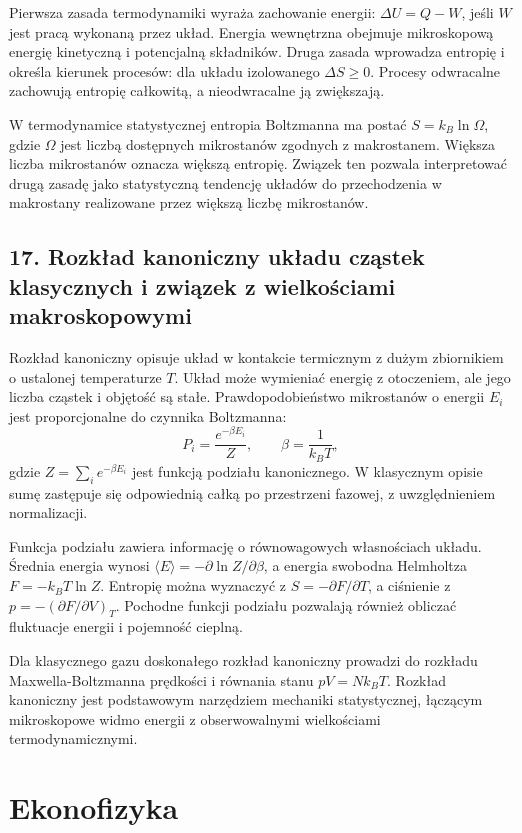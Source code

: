 \documentclass[11pt,a4paper,oneside]{report}
\begin{document}
Pierwsza zasada termodynamiki wyraża zachowanie energii: \(\Delta U=Q-W\), jeśli \(W\) jest pracą wykonaną przez układ. Energia wewnętrzna obejmuje mikroskopową energię kinetyczną i potencjalną składników. Druga zasada wprowadza entropię i określa kierunek procesów: dla układu izolowanego \(\Delta S\geq0\). Procesy odwracalne zachowują entropię całkowitą, a nieodwracalne ją zwiększają.

W termodynamice statystycznej entropia Boltzmanna ma postać \(S=k_B\ln\Omega\), gdzie \(\Omega\) jest liczbą dostępnych mikrostanów zgodnych z makrostanem. Większa liczba mikrostanów oznacza większą entropię. Związek ten pozwala interpretować drugą zasadę jako statystyczną tendencję układów do przechodzenia w makrostany realizowane przez większą liczbę mikrostanów.

\section{17. Rozkład kanoniczny układu cząstek klasycznych i związek z wielkościami makroskopowymi}
Rozkład kanoniczny opisuje układ w kontakcie termicznym z dużym zbiornikiem o ustalonej temperaturze \(T\). Układ może wymieniać energię z otoczeniem, ale jego liczba cząstek i objętość są stałe. Prawdopodobieństwo mikrostanów o energii \(E_i\) jest proporcjonalne do czynnika Boltzmanna:
\[
P_i=\frac{e^{-\beta E_i}}{Z},\qquad \beta=\frac{1}{k_BT},
\]
gdzie \(Z=\sum_i e^{-\beta E_i}\) jest funkcją podziału kanonicznego. W klasycznym opisie sumę zastępuje się odpowiednią całką po przestrzeni fazowej, z uwzględnieniem normalizacji.

Funkcja podziału zawiera informację o równowagowych własnościach układu. Średnia energia wynosi \(\langle E\rangle=-\partial\ln Z/\partial\beta\), a energia swobodna Helmholtza \(F=-k_BT\ln Z\). Entropię można wyznaczyć z \(S=-\partial F/\partial T\), a ciśnienie z \(p=-(\partial F/\partial V)_T\). Pochodne funkcji podziału pozwalają również obliczać fluktuacje energii i pojemność cieplną.

Dla klasycznego gazu doskonałego rozkład kanoniczny prowadzi do rozkładu Maxwella-Boltzmanna prędkości i równania stanu \(pV=Nk_BT\). Rozkład kanoniczny jest podstawowym narzędziem mechaniki statystycznej, łączącym mikroskopowe widmo energii z obserwowalnymi wielkościami termodynamicznymi.


\chapter{Ekonofizyka}
\end{document}
